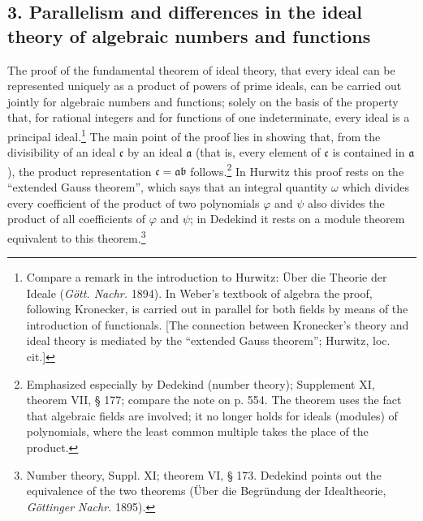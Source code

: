 \documentclass[11pt]{article}
\providecommand{\fra}{\mathfrak a}
\providecommand{\frb}{\mathfrak b}
\providecommand{\frc}{\mathfrak c}
\begin{document}
\subsection*{3. Parallelism and differences in the ideal theory of algebraic numbers and functions}
The proof of the fundamental theorem of ideal theory, that every ideal can be represented uniquely as a product of powers of prime ideals, can be carried out jointly for algebraic numbers and functions; solely on the basis of the property that, for rational integers and for functions of one indeterminate, every ideal is a principal ideal.\footnote{Compare a remark in the introduction to Hurwitz: Über die Theorie der Ideale (\emph{Gött. Nachr.} 1894). In Weber's textbook of algebra the proof, following Kronecker, is carried out in parallel for both fields by means of the introduction of functionals. [The connection between Kronecker's theory and ideal theory is mediated by the ``extended Gauss theorem''; Hurwitz, loc. cit.]} The main point of the proof lies in showing that, from the divisibility of an ideal \(\frc\) by an ideal \(\fra\) (that is, every element of \(\frc\) is contained in \(\fra\)), the product representation \(\frc=\fra\frb\) follows.\footnote{Emphasized especially by Dedekind (number theory); Supplement XI, theorem VII, § 177; compare the note on p. 554. The theorem uses the fact that algebraic fields are involved; it no longer holds for ideals (modules) of polynomials, where the least common multiple takes the place of the product.} In Hurwitz this proof rests on the ``extended Gauss theorem'', which says that an integral quantity \(\omega\) which divides every coefficient of the product of two polynomials \(\varphi\) and \(\psi\) also divides the product of all coefficients of \(\varphi\) and \(\psi\); in Dedekind it rests on a module theorem equivalent to this theorem.\footnote{Number theory, Suppl. XI; theorem VI, § 173. Dedekind points out the equivalence of the two theorems (Über die Begründung der Idealtheorie, \emph{Göttinger Nachr.} 1895).}
\end{document}
